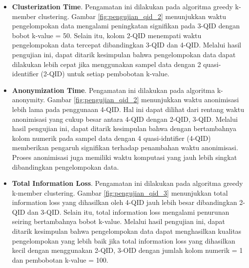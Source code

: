 \begin{itemize}

\item \textbf{Clusterization Time}. Pengamatan ini dilakukan pada algoritma greedy k-member clustering. Gambar \ref{fig:pengujian_qid_2} menunjukkan waktu pengelompokan data mengalami peningkatan signifikan pada 3-QID dengan bobot k-value = 50. Selain itu, kolom 2-QID menempati waktu pengelompokan data tercepat dibandingkan 3-QID dan 4-QID. Melalui hasil pengujian ini, dapat ditarik kesimpulan bahwa pengelompokan data dapat dilakukan lebih cepat jika menggunakan sampel data dengan 2 quasi-identifier (2-QID) untuk setiap pembobotan k-value.

\item \textbf{Anonymization Time}. Pengamatan ini dilakukan pada algoritma k-anonymity. Gambar \ref{fig:pengujian_qid_2} menunjukkan waktu anonimisasi lebih lama pada penggunaan 4-QID. Hal ini dapat dilihat dari rentang waktu anonimisasi yang cukup besar antara 4-QID dengan 2-QID, 3-QID. Melalui hasil pengujian ini, dapat ditarik kesimpulan bahwa dengan bertambahnya kolom numerik pada sampel data dengan 4 quasi-idntifier (4-QID) memberikan pengaruh signifikan terhadap penambahan waktu anonimisasi. Proses anonimisasi juga memiliki waktu komputasi yang jauh lebih singkat dibandingkan pengelompokan data.


\item \textbf{Total Information Loss}. Pengamatan ini dilakukan pada algoritma greedy k-member clustering. Gambar \ref{fig:pengujian_qid_3} menunjukkan total information loss yang dihasilkan oleh 4-QID jauh lebih besar dibandingkan 2-QID dan 3-QID. Selain itu, total information loss mengalami penurunan seiring bertambahnya bobot k-value. Melalui hasil pengujian ini, dapat ditarik kesimpulan bahwa pengelompokan data dapat menghasilkan kualitas pengelompokan yang lebih baik jika total information loss yang dihasilkan kecil dengan menggunakan 2-QID, 3-OID dengan jumlah kolom numerik = 1 dan pembobotan k-value = 100.

\end{itemize}


